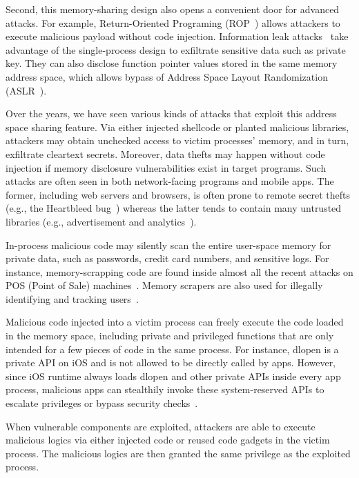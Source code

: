 Second, this memory-sharing design also opens a convenient door for advanced attacks. For example, Return-Oriented Programing (ROP~\cite{rop}) allows attackers to execute malicious payload without code injection. Information leak attacks~\cite{serna2012cve} take advantage of the single-process design to exfiltrate sensitive data such as private key. They can also disclose function pointer values stored in the same memory address space, which allows bypass of Address Space Layout Randomization (ASLR~\cite{aslr}).

Over the years, we have seen various kinds of attacks that exploit this address space sharing feature.
 Via either injected shellcode or planted malicious libraries, attackers may obtain unchecked access to victim processes' memory, and in turn, exfiltrate cleartext secrets. Moreover, data thefts may happen without code injection if memory disclosure vulnerabilities exist in target programs. Such attacks are often seen in both network-facing programs and mobile apps. The former, including web servers and browsers, is often prone to remote secret thefts (e.g., the Heartbleed bug~\cite{heartbleed}) whereas the latter tends to contain many untrusted libraries (e.g., advertisement and analytics~\cite{adinjection_profit}).

 In-process malicious code may silently scan the entire user-space memory for private data, such as passwords, credit card numbers, and sensitive logs. For instance, memory-scrapping code are found inside almost all the recent attacks on POS (Point of Sale) machines~\cite{pos}. Memory scrapers are also used for illegally identifying and tracking users~\cite{memscrap}.

 Malicious code injected into a victim process can freely execute the code loaded in the memory space, including private and privileged functions that are only intended for a few pieces of code in the same process. For instance, dlopen is a private API on iOS and is not allowed to be directly called by apps. However, since iOS runtime always loads dlopen and other private APIs inside every app process, malicious apps can stealthily invoke these system-reserved APIs to escalate privileges or bypass security checks~\cite{iris,jekyll}.

 When vulnerable components are exploited, attackers are able to execute malicious logics via either injected code or reused code gadgets in the victim process. The malicious logics are then granted the same privilege as the exploited process.

